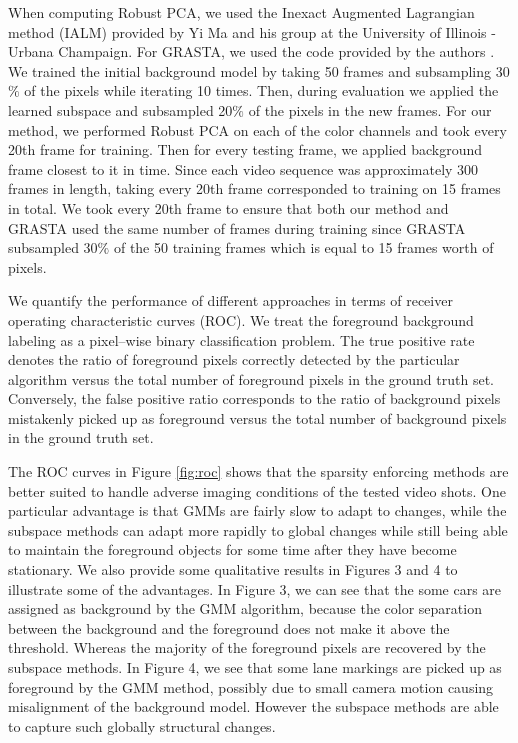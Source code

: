 \documentclass{article}
\begin{document}
When computing Robust PCA, we used the Inexact Augmented Lagrangian method (IALM) \cite{alm} provided by Yi Ma and his group at the University of Illinois - Urbana Champaign. For GRASTA, we used the code provided by the authors \cite{grastaCode}. We trained the initial background model by taking 50 frames and subsampling 30$\%$ of the pixels while iterating 10 times. Then, during evaluation we applied the learned subspace and subsampled 20$\%$ of the pixels in the new frames. For our method, we performed Robust PCA on each of the color channels and took every 20th frame for training. Then for every testing frame, we applied background frame closest to it in time. Since each video sequence was approximately 300 frames in length, taking every 20th frame corresponded to training on 15 frames in total. We took every 20th frame to ensure that both our method and GRASTA used the same number of frames during training since GRASTA subsampled 30$\%$ of the 50 training frames which is equal to 15 frames worth of pixels.

We quantify the performance of different approaches in terms of receiver operating characteristic curves (ROC).  We treat the foreground background labeling as a pixel--wise binary classification problem.  The true positive rate denotes the ratio of foreground pixels correctly detected by the particular algorithm versus the total number of foreground pixels in the ground truth set.  Conversely, the false positive ratio corresponds to the ratio of background pixels mistakenly picked up as foreground versus the total number of background pixels in the ground truth set.

The ROC curves in Figure \ref{fig:roc} shows that the sparsity enforcing methods are better suited to handle adverse imaging conditions of the tested video shots.  One particular advantage is that GMMs are fairly slow to adapt to changes, while the subspace methods can adapt more rapidly to global changes while still being able to maintain the foreground objects for some time after they have become stationary. We also provide some qualitative results in Figures 3 and 4 to illustrate some of the advantages.  In Figure 3, we can see that the some cars are assigned as background by the GMM algorithm, because the color separation between the background and the foreground does not make it above the threshold.  Whereas the majority of the foreground pixels are recovered by the subspace methods.  In Figure 4, we see that some lane markings are picked up as foreground by the GMM method, possibly due to small camera motion causing misalignment of the background model.  However the subspace methods are able to capture such globally structural changes.
\end{document}
